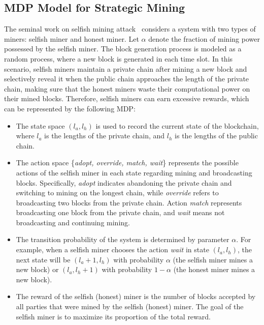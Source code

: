 \subsection{MDP Model for Strategic Mining}
The seminal work on selfish mining attack~\cite{eyal2014majority} considers a system with two types of miners: selfish miner and honest miner. 
Let $\alpha$ denote the fraction of mining power possessed by the selfish miner. 
The block generation process is modeled as a random process, where a new block is generated in each time slot. 
In this scenario, selfish miners maintain a private chain after mining a new block and selectively reveal it when the public chain approaches the length of the private chain, making sure
that
the honest miners waste their computational power on their mined blocks.
Therefore, selfish miners can earn excessive rewards, which can be represented by the following MDP:
\begin{itemize}
    \item The state space $(l_a, l_h)$ is used to record the current state of the blockchain, where $l_a$ is the lengths of the private chain, and $l_h$ is the lengths of the public chain.
    \item The action space \{\textit{adopt, override, match, wait}\} represents the possible actions of the selfish miner in each state regarding mining and broadcasting blocks. Specifically, \textit{adopt} indicates abandoning the private chain and switching to mining on the longest chain, while \textit{override} refers to broadcasting two blocks from the private chain. Action \textit{match} represents broadcasting one block from the private chain, and \textit{wait} means not broadcasting and continuing mining.    
    \item The transition probability of the system is determined by parameter $\alpha$. For example, when a selfish miner chooses the action \textit{wait} in state $(l_a, l_h)$, the next state will be $(l_a + 1, l_h)$ with probability $\alpha$ (the selfish miner mines a new block) or $(l_a, l_h + 1)$ with probability $1 - \alpha$ (the honest miner mines a new block).
    \item The reward of the selfish (honest) miner is the number of blocks accepted by all parties that were mined by the selfish (honest) miner. The goal of the selfish miner is to maximize its proportion of the total reward.
\end{itemize}

